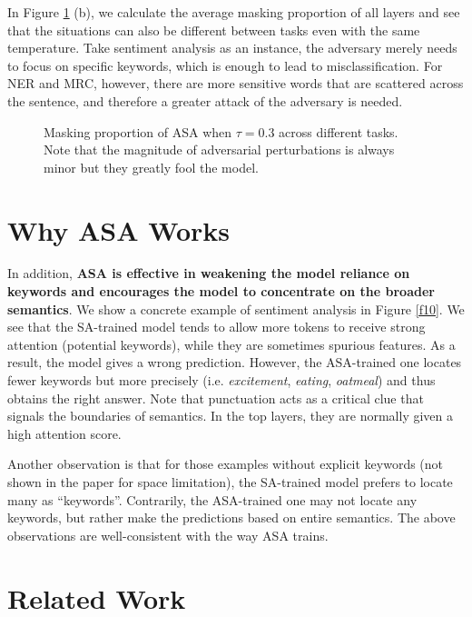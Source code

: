 \documentclass[letterpaper]{article} \usepackage{aaai23}  \usepackage{times}  \usepackage{helvet}  \usepackage{courier}  \usepackage[hyphens]{url}  \usepackage{graphicx} \urlstyle{rm} \def\UrlFont{\rm}  \usepackage{natbib}  \usepackage{caption} \frenchspacing  \setlength{\pdfpagewidth}{8.5in}  \setlength{\pdfpageheight}{11in}  \usepackage{algorithm}
\begin{document}
In Figure \ref{f6} (b), we calculate the average masking proportion of all layers and see that the situations can also be different between tasks even with the same temperature. Take sentiment analysis as an instance, the adversary merely needs to focus on specific keywords, which is enough to lead to misclassification. For NER and MRC, however, there are more sensitive words that are scattered across the sentence, and therefore a greater attack of the adversary is needed.

\begin{figure}
\centering
{}
\caption{Masking proportion of ASA when $ \tau = 0.3 $ across different tasks. Note that the magnitude of adversarial perturbations is always minor but they greatly fool the model.}
\label{f6}
\end{figure}


\section{Why ASA Works}

In addition, \textbf{ASA is effective in weakening the model reliance on keywords and encourages the model to concentrate on the broader semantics}. We show a concrete example of sentiment analysis in Figure \ref{f10}. We see that the SA-trained model tends to allow more tokens to receive strong attention (potential keywords), while they are sometimes spurious features. As a result, the model gives a wrong prediction. However, the ASA-trained one locates fewer keywords but more precisely (i.e. \textit{excitement}, \textit{eating}, \textit{oatmeal}) and thus obtains the right answer. Note that punctuation acts as a critical clue that signals the boundaries of semantics. In the top layers, they are normally given a high attention score.

Another observation is that for those examples without explicit keywords (not shown in the paper for space limitation), the SA-trained model prefers to locate many as ``keywords''. Contrarily, the ASA-trained one may not locate any keywords, but rather make the predictions based on entire semantics. The above observations are well-consistent with the way ASA trains.


\section{Related Work}
\end{document}
